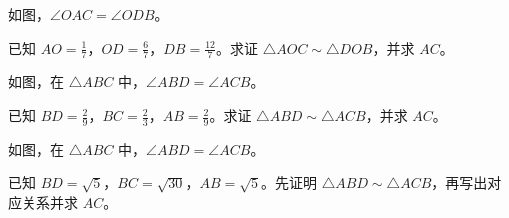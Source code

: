 \documentclass{exam-zh}
\begin{document}

\begin{problem}[points=10]
  \noindent
  \begin{minipage}[t]{\dimexpr\linewidth-60mm-6mm\relax}
    \vspace{0pt}
    如图，$\angle OAC=\angle ODB$。

已知 $AO=\frac{1}{7}$，$OD=\frac{6}{7}$，$DB=\frac{12}{7}$。求证 $\triangle AOC\sim\triangle DOB$，并求 $AC$。
    
  \end{minipage}\hfill
  \begin{diagramcoltikz}{60mm}{先用对顶角补齐第二组等角，再按顶点顺序配边。}
  }
  \end{diagramcoltikz}
  \par\medskip
  \answerarea[48mm]
\end{problem}



\begin{problem}[points=10]
  \noindent
  \begin{minipage}[t]{\dimexpr\linewidth-60mm-6mm\relax}
    \vspace{0pt}
    如图，在 $\triangle ABC$ 中，$\angle ABD=\angle ACB$。

已知 $BD=\frac{2}{9}$，$BC=\frac{2}{3}$，$AB=\frac{2}{9}$。求证 $\triangle ABD\sim\triangle ACB$，并求 $AC$。
    
  \end{minipage}\hfill
  \begin{diagramcoltikz}{60mm}{先确认对应边，再判断题中的线段是否属于相似三角形。}
  }
  \end{diagramcoltikz}
  \par\medskip
  \answerarea[48mm]
\end{problem}



\begin{problem}[points=10]
  \noindent
  \begin{minipage}[t]{\dimexpr\linewidth-60mm-6mm\relax}
    \vspace{0pt}
    如图，在 $\triangle ABC$ 中，$\angle ABD=\angle ACB$。

已知 $BD=\sqrt{5}$，$BC=\sqrt{30}$，$AB=\sqrt{5}$。先证明 $\triangle ABD\sim\triangle ACB$，再写出对应关系并求 $AC$。
    
  \end{minipage}\hfill
  \begin{diagramcoltikz}{60mm}{先确认对应边，再判断题中的线段是否属于相似三角形。}
  }
  \end{diagramcoltikz}
  \par\medskip
  \answerarea[48mm]
\end{problem}
\end{document}
